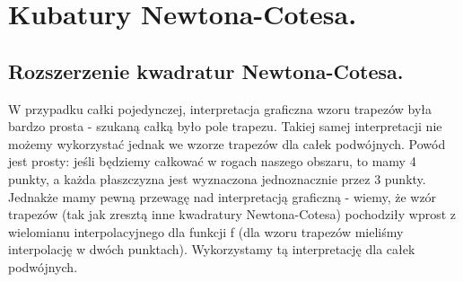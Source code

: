 \documentclass[10pt,wide]{mwart}
\theoremstyle{definition}
\begin{document}
\section{Kubatury Newtona-Cotesa.}
\subsection{Rozszerzenie kwadratur Newtona-Cotesa.}
W przypadku całki pojedynczej, interpretacja graficzna wzoru trapezów była bardzo prosta - szukaną całką było pole trapezu. Takiej samej interpretacji nie możemy wykorzystać jednak we wzorze trapezów dla całek podwójnych.
 Powód jest prosty: jeśli będziemy całkować w rogach naszego obszaru, to mamy 4 punkty, a każda płaszczyzna jest wyznaczona jednoznacznie przez 3 punkty. Jednakże mamy pewną przewagę nad interpretacją graficzną -
 wiemy, że wzór trapezów (tak jak zresztą inne kwadratury Newtona-Cotesa) pochodziły wprost z wielomianu interpolacyjnego dla funkcji f (dla wzoru trapezów mieliśmy interpolację w dwóch punktach).
 Wykorzystamy tą interpretację dla całek podwójnych.
\end{document}
